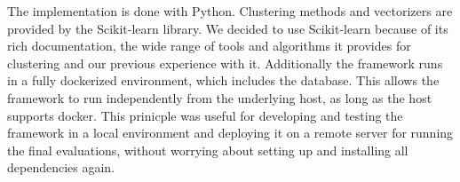 The implementation is done with Python. Clustering methods and vectorizers are provided by the Scikit-learn library\cite{scikit-learn}. We decided to use Scikit-learn because of its rich documentation, the wide range of tools and algorithms it provides for clustering and our previous experience with it. Additionally the framework runs in a fully dockerized environment, which includes the database. This allows the framework to run independently from the underlying host, as long as the host supports docker. This prinicple was useful for developing and testing the framework in a local environment and deploying it on a remote server for running the final evaluations, without worrying about setting up and installing all dependencies again.

